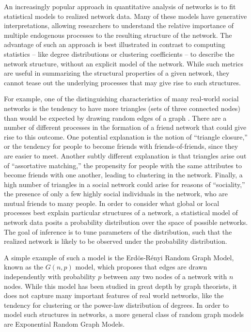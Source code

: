 
An increasingly popular approach in quantitative analysis of networks is to fit statistical models to realized network data. Many of these models have generative interpretations, allowing researchers to understand the relative importance of multiple endogenous processes to the resulting structure of the network. The advantage of such an approach is best illustrated in contrast to computing statistics -- like degree distributions or clustering coefficients -- to describe the network structure, without an explicit model of the network. While such metrics are useful in summarizing the structural properties of a given network, they cannot tease out the underlying processes that may give rise to such structures. 

For example, one of the distinguishing characteristics of many real-world social networks is the tendency to have more triangles (sets of three connected nodes) than would be expected by drawing random edges of a graph \cite{GKM09}. There are a number of different processes in the formation of a friend network that could give rise to this outcome. One potential explanation is the notion of ``triangle closure,'' or the tendency for people to become friends with friends-of-friends, since they are easier to meet. Another subtly different explanation is that triangles arise out of ``assortative matching,'' the propensity for people with the same attributes to become friends with one another, leading to clustering in the network. Finally, a high number of triangles in a social network could arise for reasons of ``sociality,''  the presence of only a few highly social individuals in the network, who are mutual friends to many people. In order to consider what global or local processes best explain particular structures of a network, a statistical model of network data posits a probability distribution over the space of possible networks. The goal of inference  is to tune parameters of the distribution, such that the realized network is likely to be observed under the probability distribution. 

A simple example of such a model is the Erd\"{o}s-R\'{e}nyi Random Graph Model, known as the $G(n,p)$ model, which proposes that edges are drawn independently with probability $p$ between any two nodes of a network with $n$ nodes. While this model has been studied in great depth by graph theorists, it does not capture many important features of real world networks, like the tendency for clustering or the power-law distribution of degrees. In order to model such structures in networks, a more general class of random graph models are Exponential Random Graph Models.

